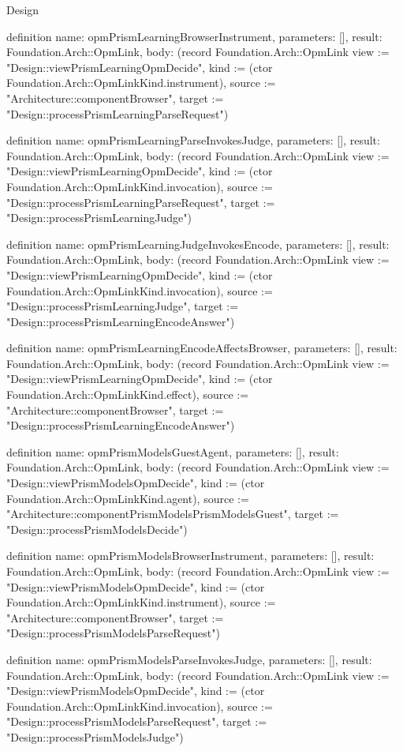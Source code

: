 \begin{lexlean}{Design}
\begin{semanticmodule}
definition{
  name: opmPrismLearningBrowserInstrument,
  parameters: [],
  result: Foundation.Arch::OpmLink,
  body: (record Foundation.Arch::OpmLink {view := "Design::viewPrismLearningOpmDecide", kind := (ctor Foundation.Arch::OpmLinkKind.instrument), source := "Architecture::componentBrowser", target := "Design::processPrismLearningParseRequest"})
}

definition{
  name: opmPrismLearningParseInvokesJudge,
  parameters: [],
  result: Foundation.Arch::OpmLink,
  body: (record Foundation.Arch::OpmLink {view := "Design::viewPrismLearningOpmDecide", kind := (ctor Foundation.Arch::OpmLinkKind.invocation), source := "Design::processPrismLearningParseRequest", target := "Design::processPrismLearningJudge"})
}

definition{
  name: opmPrismLearningJudgeInvokesEncode,
  parameters: [],
  result: Foundation.Arch::OpmLink,
  body: (record Foundation.Arch::OpmLink {view := "Design::viewPrismLearningOpmDecide", kind := (ctor Foundation.Arch::OpmLinkKind.invocation), source := "Design::processPrismLearningJudge", target := "Design::processPrismLearningEncodeAnswer"})
}

definition{
  name: opmPrismLearningEncodeAffectsBrowser,
  parameters: [],
  result: Foundation.Arch::OpmLink,
  body: (record Foundation.Arch::OpmLink {view := "Design::viewPrismLearningOpmDecide", kind := (ctor Foundation.Arch::OpmLinkKind.effect), source := "Architecture::componentBrowser", target := "Design::processPrismLearningEncodeAnswer"})
}

definition{
  name: opmPrismModelsGuestAgent,
  parameters: [],
  result: Foundation.Arch::OpmLink,
  body: (record Foundation.Arch::OpmLink {view := "Design::viewPrismModelsOpmDecide", kind := (ctor Foundation.Arch::OpmLinkKind.agent), source := "Architecture::componentPrismModelsPrismModelsGuest", target := "Design::processPrismModelsDecide"})
}

definition{
  name: opmPrismModelsBrowserInstrument,
  parameters: [],
  result: Foundation.Arch::OpmLink,
  body: (record Foundation.Arch::OpmLink {view := "Design::viewPrismModelsOpmDecide", kind := (ctor Foundation.Arch::OpmLinkKind.instrument), source := "Architecture::componentBrowser", target := "Design::processPrismModelsParseRequest"})
}

definition{
  name: opmPrismModelsParseInvokesJudge,
  parameters: [],
  result: Foundation.Arch::OpmLink,
  body: (record Foundation.Arch::OpmLink {view := "Design::viewPrismModelsOpmDecide", kind := (ctor Foundation.Arch::OpmLinkKind.invocation), source := "Design::processPrismModelsParseRequest", target := "Design::processPrismModelsJudge"})
}


\end{semanticmodule}
\end{lexlean}
